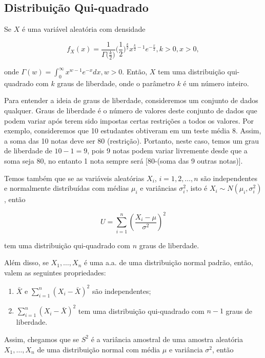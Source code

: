 \documentclass[
]{book}
\begin{document}
\hypertarget{distribuiuxe7uxe3o-qui-quadrado}{%
\subsection{Distribuição Qui-quadrado}\label{distribuiuxe7uxe3o-qui-quadrado}}

Se \(X\) é uma variável aleatória com densidade

\[f_X(x)=\frac{1}{\Gamma\big({\frac{k}{2}}\big)}\big(\frac{1}{2}\big)^{\frac{k}{2}}x^{\frac{k}{2}-1}e^{-\frac{x}{2}},k>0,x>0,\]

onde \(\Gamma(w)=\int_0^\infty x^{w-1}e^{-x}dx, w>0\). Então, \(X\) tem uma distribuição qui-quadrado com \(k\) graus de liberdade, onde o parâmetro \(k\) é um número inteiro.

Para entender a ideia de graus de liberdade, consideremos um conjunto de dados qualquer. Graus de liberdade é o número de valores deste conjunto de dados que podem variar após terem sido impostas certas restrições a todos os valores. Por exemplo, consideremos que 10 estudantes obtiveram em um teste média 8. Assim, a soma das 10 notas deve ser 80 (restrição). Portanto, neste caso, temos um grau de liberdade de \(10-1=9\), pois 9 notas podem variar livremente desde que a soma seja 80, no entanto 1 nota sempre será {[}80-(soma das 9 outras notas){]}.

Temos também que se as variáveis aleatórias \(X_i\), \(i=1,2,\ldots,n\) são independentes e normalmente distribuídas com médias \(\mu_i\) e variâncias \(\sigma^2_i\), isto é \(X_i\sim N(\mu_i,\sigma^2_i)\), então

\[U=\sum_{i=1}^{n}\left(\frac{X_i-\mu}{\sigma^2}\right)^2\]

tem uma distribuição qui-quadrado com \(n\) graus de liberdade.

Além disso, se \(X_1,\ldots,X_n\) é uma a.a. de uma distribuição normal padrão, então, valem as seguintes propriedades:

\begin{enumerate}
\def\labelenumi{(\roman{enumi})}
\item
  \(\bar X\) e \(\sum_{i=1}^{n}(X_i-\bar X)^2\) são independentes;
\item
  \(\sum_{i=1}^{n}(X_i-\bar X)^2\) tem uma distribuição qui-quadrado com \(n-1\) graus de liberdade.
\end{enumerate}

Assim, chegamos que se \(S^2\) é a variância amostral de uma amostra aleatória \(X_1,\ldots,X_n\) de uma distribuição normal com média \(\mu\) e variância \(\sigma^2\), então
\end{document}
